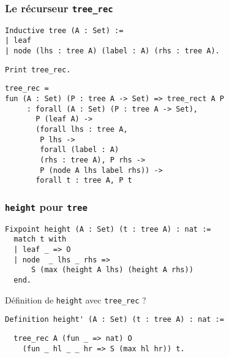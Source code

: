 \documentclass{beamer}
\begin{document}
\begin{frame}[fragile]
  \frametitle{Le récurseur \texttt{tree_rec}}

\begin{verbatim}
Inductive tree (A : Set) :=
| leaf
| node (lhs : tree A) (label : A) (rhs : tree A).
\end{verbatim}

\begin{verbatim}
Print tree_rec.
\end{verbatim}
\pause
\begin{verbatim}
tree_rec =
fun (A : Set) (P : tree A -> Set) => tree_rect A P
     : forall (A : Set) (P : tree A -> Set),
       P (leaf A) ->
       (forall lhs : tree A,
        P lhs ->
        forall (label : A)
        (rhs : tree A), P rhs ->
        P (node A lhs label rhs)) ->
       forall t : tree A, P t
\end{verbatim}
\end{frame}

\begin{frame}[fragile]
  \frametitle{\texttt{height} pour \texttt{tree}}

\begin{verbatim}
Fixpoint height (A : Set) (t : tree A) : nat :=
  match t with
  | leaf _ => O
  | node  _ lhs _ rhs =>
      S (max (height A lhs) (height A rhs))
  end.
\end{verbatim}
\vfill
Définition de \texttt{height} avec \texttt{tree_rec} ?
\begin{verbatim}
Definition height' (A : Set) (t : tree A) : nat :=
\end{verbatim}
\pause
\begin{verbatim}
  tree_rec A (fun _ => nat) O
    (fun _ hl _ _ hr => S (max hl hr)) t.
\end{verbatim}
\end{frame}
\end{document}
